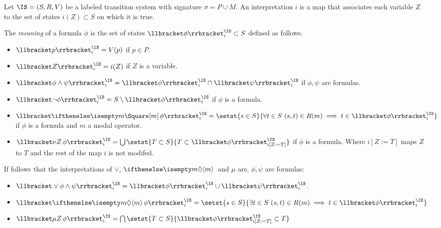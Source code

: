 \begin{definition}
    Let $\IS = (S, R, V)$ be a labeled transition system with signature $\sigma = P \cup M$.
    An interpretation $i$ is a map that associates each variable $Z$
    to the set of states $i(Z) \subset S$ on which it is true.

    The \emph{meaning} of a formula $\phi$ is the set of states $\Meaning{\phi}^\IS_i \subset S$
    defined as follows.
    \begin{itemize}
        \item $\Meaning{p}^\IS_i = V(p)$ if $p \in P$.
        \item $\Meaning{Z}^\IS_i = i(Z)$ if $Z$ is a variable.
        \item $\Meaning{\phi \wedge \psi}^\IS_i = \Meaning{\phi}^\IS_i \cap \Meaning{\psi}^\IS_i$
            if $\phi, \psi$ are formulas.
        \item $\Meaning{\neg \phi}^\IS_i = S \setminus \Meaning{\phi}^\IS_i$
            if $\phi$ is a formula.
        \item $\Meaning{\boite m \phi}^\IS_i = \setst{s \in S}{
            \forall t \in S~ (s, t) \in R(m) \implies t \in \Meaning{\phi}^\IS_i}$
            if $\phi$ is a formula and $m$ a modal operator.
        \item $\Meaning{\nu Z \, \phi}^\IS_i = \bigcup \setst{T \subset S}{T \subset \Meaning{\phi}^\IS_{i[Z := T]}}$
            if $\phi$ is a formula. Where $i[Z := T]$ maps $Z$ to $T$ and the rest of the map $i$ is not modifed.
    \end{itemize}
    If follows that the interpretations of $\vee$, $\diam{m}$ and $\mu$
    are, $\phi, \psi$ are formulas:
    \begin{itemize}
        \item $\Meaning{\vee \phi \wedge \psi}^\IS_i = \Meaning{\phi}^\IS_i \cup \Meaning{\psi}^\IS_i$.
        \item $\Meaning{\diam m \phi}^\IS_i = \setst{s \in S}{\exists t \in S~ (s, t) \in R(m) \implies t \in \Meaning{\phi}^\IS_i}$
        \item $\Meaning{\mu Z\, \phi}^\IS_i = \bigcap \setst{T \subset S}{\Meaning{\phi}^\IS_{i[Z := T]} \subset T}$
    \end{itemize}
\end{definition}

